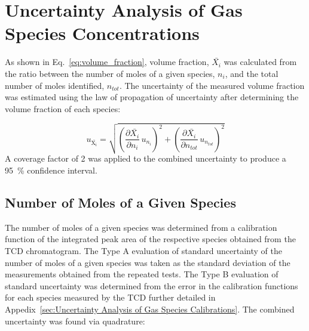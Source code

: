 \documentclass[12pt]{article}
\begin{document}
\pagebreak


\appendix
{}
\makeatletter
\newcommand{\section@cntformat}{Appendix:\ }
\makeatother

\section{Uncertainty Analysis of Gas Species Concentrations} \label{sec:UncertaintyGasSpecies}

As shown in Eq.~\ref{eq:volume_fraction}, volume fraction, $\bar{X_{i}}$ was calculated from the ratio between the number of moles of a given species, $n_{i}$, and the total number of moles identified, $n_{tot}$. The uncertainty of the measured volume fraction was estimated using the law of propagation of uncertainty after determining the volume fraction of each species:

\begin{equation}
\label{eq:Volume_Frac_Uncertainty}
u_\mathrm{\bar{X_{i}}} = \sqrt{{\left( \frac{\partial \bar{X_{i}}}{\partial n_{i}}\,u_{\scriptscriptstyle n_{i}} \right)}^2+{\left(\frac{\partial \bar{X_{i}}}{\partial n_{tot}}\,u_{\scriptscriptstyle n_{tot}}\right)}^2}
\end{equation}
A coverage factor of 2 was applied to the combined uncertainty to produce a 95~\% confidence interval.

\subsection{Number of Moles of a Given Species}
\label{ssec:Number_of_Moles_of_a_Given_Species}

The number of moles of a given species was determined from a calibration function of the integrated peak area of the respective species obtained from the TCD chromatogram. The Type A evaluation of standard uncertainty of the number of moles of a given species was taken as the standard deviation of the measurements obtained from the repeated tests. The Type B evaluation of standard uncertainty was determined from the error in the calibration functions for each species measured by the TCD further detailed in Appedix~\ref{sec:Uncertainty Analysis of Gas Species Calibrations}. The combined uncertainty was found via quadrature:
\end{document}
